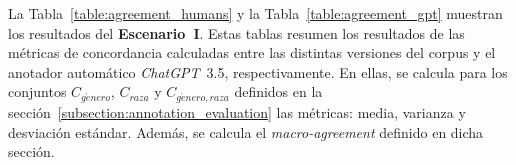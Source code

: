 La Tabla~\ref{table:agreement_humans} y la Tabla~\ref{table:agreement_gpt} muestran los resultados del \textbf{Escenario~I}.
Estas tablas resumen los resultados de las m\'etricas de concordancia calculadas entre las distintas
versiones del corpus y el anotador autom\'atico \emph{ChatGPT}~3.5, respectivamente. En ellas, se 
calcula para los conjuntos $C_{g\acute{e}nero}$, $C_{raza}$ y $C_{g\acute{e}nero, raza}$ definidos
en la secci\'on~\ref{subsection:annotation_evaluation} las m\'etricas: media, varianza y desviaci\'on
est\'andar. Adem\'as, se calcula el \emph{macro-agreement} definido en dicha secci\'on.

\begin{table}[htpb]
    \centering
    \caption{Resumen de m\'etricas de concordancia entre las distintas versiones del corpus.}
    \label{table:agreement_humans}
\end{table}

